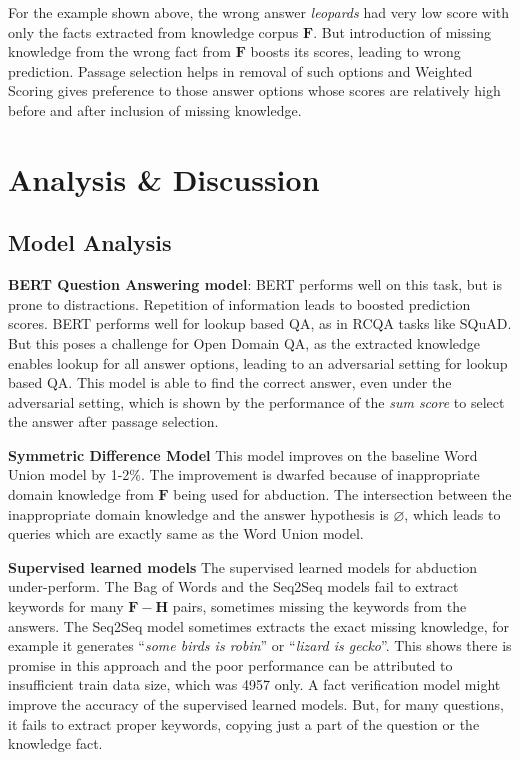 \documentclass[11pt,a4paper]{article}
\begin{document}
For the example shown above, the wrong answer \textit{leopards} had very low score with only the facts extracted from knowledge corpus $\mathbf{F}$. But introduction of missing knowledge from the wrong fact from $\mathbf{F}$  boosts its scores, leading to wrong prediction. Passage selection helps in removal of such options and Weighted Scoring gives preference to those answer options whose scores are relatively high before and after inclusion of missing knowledge.


\section{Analysis \& Discussion}
\subsection{Model Analysis}




\textbf{BERT Question Answering model}:
BERT performs well on this task, but is prone to distractions. Repetition of information leads to boosted prediction scores. BERT performs well for lookup based QA, as in RCQA tasks like SQuAD. But this poses a challenge for Open Domain QA, as the extracted knowledge enables lookup for all answer options, leading to an adversarial setting for lookup based QA. This model is able to find the correct answer, even under the adversarial setting, which is shown by the performance of the \textit{sum score} to select the answer after passage selection.
     
    \textbf{Symmetric Difference Model}
     This model improves on the baseline Word Union model by 1-2\%. The improvement is dwarfed because of inappropriate domain knowledge from $\mathbf{F}$ being used for abduction. The intersection between the inappropriate domain knowledge and the answer hypothesis is $\mathbf{\varnothing}$, which leads to queries which are exactly same as the Word Union model.
    
    \textbf{Supervised learned models}
     The supervised learned models for abduction under-perform. The Bag of Words and the Seq2Seq models fail to extract keywords for many $\mathbf{F}-\mathbf{H}$ pairs, sometimes missing the keywords from the answers. The Seq2Seq model sometimes extracts the exact missing knowledge, for example it generates ``\textit{some birds is robin}'' or ``\textit{lizard is gecko}''. This shows there is promise in this approach and the poor performance can be attributed to insufficient train data size, which was 4957 only. A fact verification model might improve the accuracy of the supervised learned models. But, for many questions, it fails to extract proper keywords, copying just a part of the question or the knowledge fact. 
\end{document}
